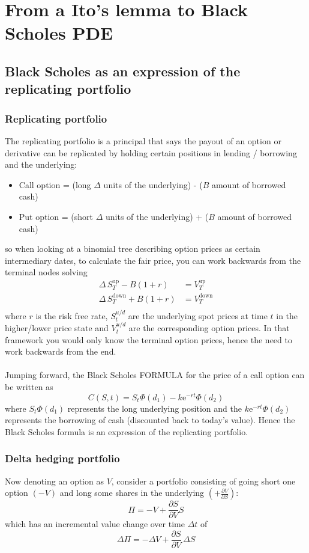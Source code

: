 \documentclass[12pt]{article}
\newcommand{\dpart}[2]{\frac{\partial #1}{\partial #2}}
\begin{document}
\section{From a Ito's lemma to Black Scholes PDE}
\subsection{Black Scholes as an expression of the replicating portfolio}
\subsubsection{Replicating portfolio}
The replicating portfolio is a principal that says the payout of an option or derivative can be replicated by holding certain positions in lending / borrowing and the underlying:
\begin{itemize}
	\item Call option = (long $\Delta$ units of the underlying) - ($B$ amount of borrowed cash)
	\item Put option = (short $\Delta$ units of the underlying) + ($B$ amount of borrowed cash)
\end{itemize}
so when looking at a binomial tree describing option prices as certain intermediary dates, to calculate the fair price, you can work backwards from the terminal nodes solving
\begin{align}
	\Delta\,S^{\mathrm{up}}_T-B(1+r)&=V^{\mathrm{up}}_T\\
	\Delta\,S^{\mathrm{down}}_T+B(1+r)&=V^{\mathrm{down}}_T\\
\end{align}
where $r$ is the risk free rate, $S_t^{u/d}$ are the underlying spot prices at time $t$ in the higher/lower price state and $V_t^{u/d}$ are the corresponding option prices. In that framework you would only know the terminal option prices, hence the need to work backwards from the end.\\
\\
Jumping forward, the Black Scholes FORMULA for the price of a call option can be written as
\begin{equation}
	C(S,t)=S_t\Phi(d_1) - k\mathrm{e}^{-rt}\Phi(d_2)
\end{equation}
where $S_t\Phi(d_1)$ represents the long underlying position and the $k\mathrm{e}^{-rt}\Phi(d_2)$ represents the borrowing of cash (discounted back to today's value). Hence the Black Scholes formula is an expression of the replicating portfolio.

\subsubsection{Delta hedging portfolio}
Now denoting an option as $V$, consider a portfolio consisting of going short one option $(-V)$ and long some shares in the underlying $(+\dpart{V}{S})$:
\begin{equation}
	\Pi=-V+\dpart{S}{V}S
\end{equation}
which has an incremental value change over time $\Delta t$ of
\begin{equation}\label{DeltaHedgePortfolio}
	\Delta\Pi=-\Delta V+\dpart{S}{V}\,\Delta S
\end{equation}
\end{document}
